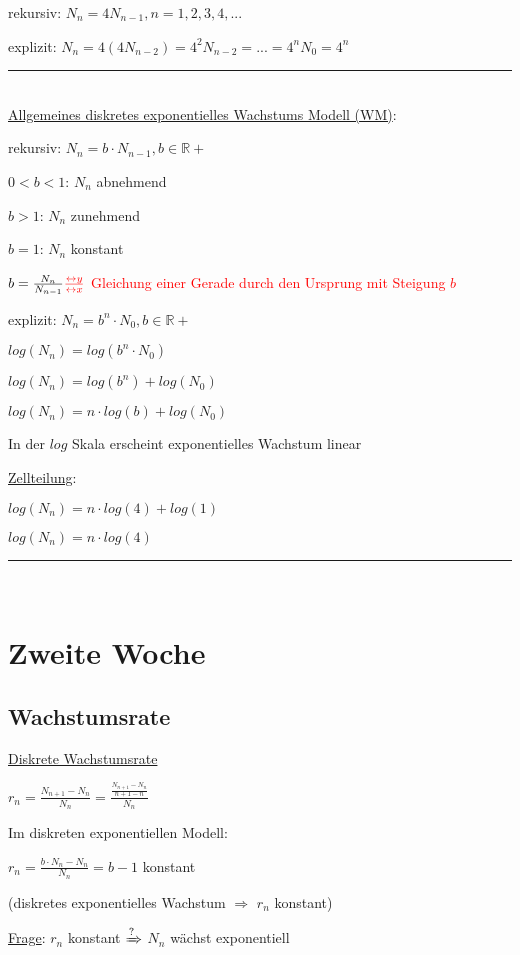 \documentclass[18pt,a4paper]{scrreprt}
\begin{document}
rekursiv: $N_n = 4N_{n-1}, n = 1, 2, 3, 4, ...$

explizit: $N_n = 4(4N_{n-2}) = 4^2N_{n-2} = ... = 4^nN_0 = 4^n$

\rule{\textwidth}{0.4mm}\\

\uline{Allgemeines diskretes exponentielles Wachstums Modell (WM)}:

rekursiv: $N_n = b \cdot N_{n-1}, b \in \mathbb{R+}$

$0 < b < 1$: $N_n$ abnehmend

$b > 1$: $N_n$ zunehmend

$b = 1$: $N_n$ konstant

$b = \frac{N_n}{N_{n-1}} \textcolor{red}{\frac{\leftrightarrow y}{\leftrightarrow x}}$ \textcolor{red}{Gleichung einer Gerade durch den Ursprung mit Steigung $b$}

explizit: $N_n = b^n \cdot N_0, b \in \mathbb{R+}$

$log(N_n) = log(b^n \cdot N_0)$

$log(N_n) = log(b^n) + log(N_0)$

$log(N_n) = n\cdot log(b) + log(N_0)$

In der $log$ Skala erscheint exponentielles Wachstum linear

\uline{Zellteilung}:

$log(N_n) = n\cdot log(4) + log(1)$

$log(N_n) = n\cdot log(4)$

\rule{\textwidth}{0.4mm}\\

\chapter{Zweite Woche}

\section{Wachstumsrate}

\uline{Diskrete Wachstumsrate}

$r_n = \frac{N_{n+1} - N_n}{N_n} = \frac{\frac{N_{n+1} - N_n}{n+1 -n}}{N_n}$

Im diskreten exponentiellen Modell:

$r_n = \frac{b\cdot N_n - N_n}{N_n} = b-1$ konstant

(diskretes exponentielles Wachstum $\Rightarrow$ $r_n$ konstant)

\uline{Frage}: $r_n$ konstant $\xRightarrow{?}$ $N_n$ wächst exponentiell
\end{document}
